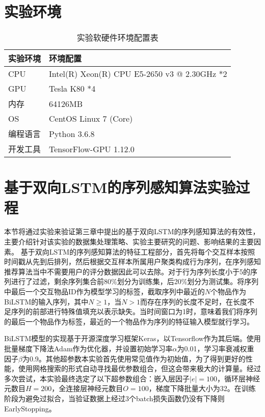 \section{实验环境}
\begin{table}[H]
\centering
\caption{实验软硬件环境配置表}
\label{tab:set}
  \begin{tabular}{@{}ll@{}}
  \toprule
  实验环境 & 环境配置                                  \\ \midrule
  CPU  & Intel(R) Xeon(R) CPU E5-2650 v3 @ 2.30GHz *2 \\
  GPU  & Tesla K80 *4                                 \\
  内存   & 64126MB                                      \\
  OS   & CentOS Linux 7 (Core)                        \\
  编程语言 & Python 3.6.8                                 \\
  开发工具 & TensorFlow-GPU 1.12.0                        \\ \bottomrule
  \end{tabular}
\end{table}

\section{基于双向LSTM的序列感知算法实验过程}

本节将通过实验来验证第三章中提出的基于双向LSTM的序列感知算法的有效性，主要介绍针对该实验的数据集处理策略、实验主要研究的问题、影响结果的主要因素。
基于双向LSTM的序列感知算法的特征工程部分，首先将每个交互样本按照时间戳从先到后排列，然后根据交互样本所属用户聚类构成行为序列，在序列感知推荐算法当中不需要用户的评分数据因此可以去除。对于行为序列长度小于5的序列进行了过滤，剩余序列集合前80\%划分为训练集，后20\%划分为测试集。将序列中最后一个交互物品ID作为模型学习的标签，截取序列中最近的$N$个物品作为BiLSTM的输入序列，其中$N\geq 1$，当$N>1$而存在序列的长度不足时，在长度不足序列的前部进行特殊值填充以表示缺失。当时间窗口为1时，意味着我们将序列的最后一个物品作为标签，最近的一个物品作为序列的特征输入模型就行学习。

BiLSTM模型的实现基于开源深度学习框架Keras，以Tensorflow作为其后端。使用批量梯度下降法Adam作为优化器，并设置初始学习率$\alpha$为0.01，学习率衰减权重因子$\beta$为0.9。其他超参数本实验首先使用常见值作为初始值，为了得到更好的性能，使用网格搜索的形式自动寻找最优参数组合，但这会带来极大的计算量。经过多次尝试，本实验最终选定了以下超参数组合：嵌入层因子$|e|=100$，循环层神经元数目$H=200$，全连接层神经元数目$O=100$，梯度下降批量大小为32。在训练阶段为避免过拟合，当验证数据上经过3个batch损失函数仍没有下降则EarlyStopping。


